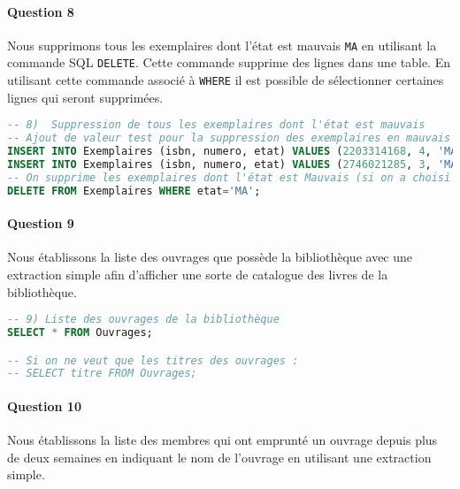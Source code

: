 \documentclass[10pt, oneside]{article}
\begin{document}

\paragraph{Question 8} 
Nous supprimons tous les exemplaires dont l'état est mauvais \texttt{MA} en utilisant la commande SQL \texttt{DELETE}. Cette commande supprime des lignes dans une table. En utilisant cette commande associé à \texttt{WHERE} il est possible de sélectionner certaines lignes qui seront supprimées.

\begin{lstlisting}[language=sql, title=Question 8, label=QII8]
-- 8)  Suppression de tous les exemplaires dont l'état est mauvais
-- Ajout de valeur test pour la suppression des exemplaires en mauvais état
INSERT INTO Exemplaires (isbn, numero, etat) VALUES (2203314168, 4, 'MA');
INSERT INTO Exemplaires (isbn, numero, etat) VALUES (2746021285, 3, 'MA');
-- On supprime les exemplaires dont l'état est Mauvais (si on a choisi de les noter MA sans les supprimer à la question précédente)
DELETE FROM Exemplaires WHERE etat='MA';
\end{lstlisting}


\paragraph{Question 9} Nous établissons la liste des ouvrages que possède la bibliothèque avec une extraction simple afin d'afficher une sorte de catalogue des livres de la bibliothèque.

\begin{lstlisting}[language=sql, title=Question 9, label=QII9]
-- 9) Liste des ouvrages de la bibliothèque
SELECT * FROM Ouvrages;

-- Si on ne veut que les titres des ouvrages :
-- SELECT titre FROM Ouvrages;
\end{lstlisting}


\paragraph{Question 10} Nous établissons la liste des membres qui ont emprunté un ouvrage depuis plus de deux semaines en indiquant le nom de l'ouvrage en utilisant une extraction simple.
\end{document}
